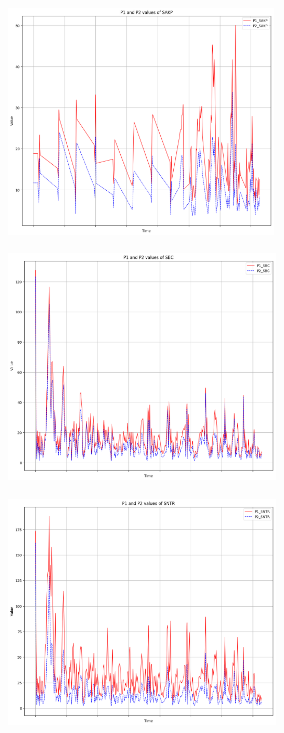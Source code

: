 \documentclass[12pt,a4paper,twoside]{scrartcl}
\numberwithin{equation}{section}
\begin{document}
\begin{figure}[H]
  \centering
  \begin{subfigure}[t]{0.32\textwidth}
    \includegraphics[width=\textwidth,height=6cm]{figures/1D_SAKP_plot}%
    \label{fig:y equals x}
    \caption{}
  \end{subfigure}
  \begin{subfigure}[t]{0.32\textwidth}
    \includegraphics[width=\textwidth,height=6cm]{figures/1D_SBC_plot}%
    \label{fig:y equals x}
    \caption{}
  \end{subfigure}
  \begin{subfigure}[t]{0.32\textwidth}
    \includegraphics[width=\textwidth,height=6cm]{figures/1D_SNTR_plot}%
    \label{fig:y equals x}
    \caption{}
  \end{subfigure}


\end{figure}
\end{document}
